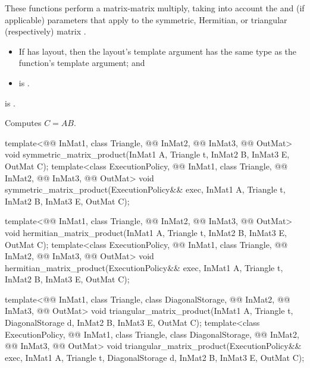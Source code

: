 \begin{itemdescr}
\pnum
These functions perform a matrix-matrix multiply,
taking into account
the  and  (if applicable) parameters
that apply to the symmetric, Hermitian, or triangular (respectively) matrix .

\pnum
\mandates
\begin{itemize}
\item
If  has  layout,
then the layout's  template argument has
the same type as the function's  template argument; and
\item
{} is .
\end{itemize}

\pnum
\expects
{} is .

\pnum
\effects
Computes $C = A B$.
\end{itemdescr}

\begin{itemdecl}
template<@@ InMat1, class Triangle, @@ InMat2, @@ InMat3,
         @@ OutMat>
  void symmetric_matrix_product(InMat1 A, Triangle t, InMat2 B, InMat3 E, OutMat C);
template<class ExecutionPolicy,
         @@ InMat1, class Triangle, @@ InMat2, @@ InMat3,
         @@ OutMat>
  void symmetric_matrix_product(ExecutionPolicy&& exec,
                                InMat1 A, Triangle t, InMat2 B, InMat3 E, OutMat C);

template<@@ InMat1, class Triangle, @@ InMat2, @@ InMat3,
         @@ OutMat>
  void hermitian_matrix_product(InMat1 A, Triangle t, InMat2 B, InMat3 E, OutMat C);
template<class ExecutionPolicy,
         @@ InMat1, class Triangle, @@ InMat2, @@ InMat3,
         @@ OutMat>
  void hermitian_matrix_product(ExecutionPolicy&& exec,
                                InMat1 A, Triangle t, InMat2 B, InMat3 E, OutMat C);

template<@@ InMat1, class Triangle, class DiagonalStorage,
         @@ InMat2, @@ InMat3, @@ OutMat>
  void triangular_matrix_product(InMat1 A, Triangle t, DiagonalStorage d, InMat2 B, InMat3 E,
                                 OutMat C);
template<class ExecutionPolicy,
         @@ InMat1, class Triangle, class DiagonalStorage,
         @@ InMat2, @@ InMat3, @@ OutMat>
  void triangular_matrix_product(ExecutionPolicy&& exec,
                                 InMat1 A, Triangle t, DiagonalStorage d, InMat2 B, InMat3 E,
                                 OutMat C);
\end{itemdecl}

